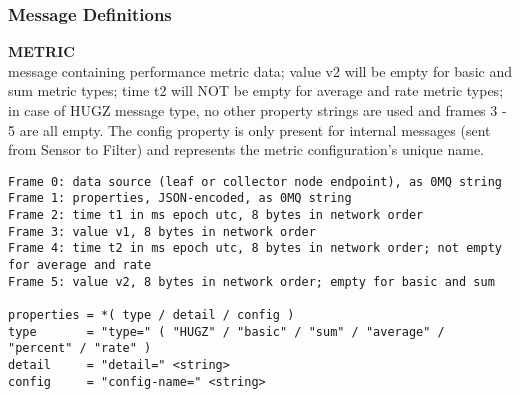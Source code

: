 \subsubsection{Message Definitions}

\textbf{METRIC} \\
message containing performance metric data; value v2 will be empty for basic and sum metric types; time t2 will NOT be
empty for average and rate metric types; in case of HUGZ message type, no other property strings are used and frames 3 -
5 are all empty. The config property is only present for internal messages (sent from Sensor to Filter) and represents
the metric configuration's unique name.

\begin{verbatim}
Frame 0: data source (leaf or collector node endpoint), as 0MQ string
Frame 1: properties, JSON-encoded, as 0MQ string
Frame 2: time t1 in ms epoch utc, 8 bytes in network order
Frame 3: value v1, 8 bytes in network order
Frame 4: time t2 in ms epoch utc, 8 bytes in network order; not empty for average and rate
Frame 5: value v2, 8 bytes in network order; empty for basic and sum

properties = *( type / detail / config )
type       = "type=" ( "HUGZ" / "basic" / "sum" / "average" / "percent" / "rate" )
detail     = "detail=" <string>
config     = "config-name=" <string>
\end{verbatim}
